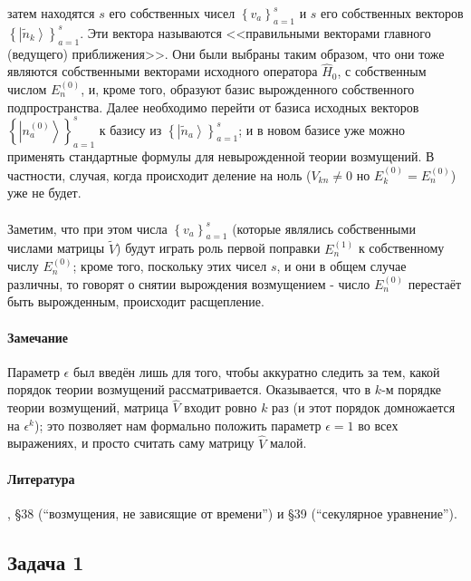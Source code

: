 \documentclass[a4paper,12pt]{article}
\begin{document}
\noindent
затем находятся $s$ его собственных чисел $\left\{ v_{a}\right\} _{a=1}^{s}$
и $s$ его собственных векторов $\left\{ \left|\widetilde{n}_{k}\right\rangle \right\} _{a=1}^{s}$.
Эти вектора называются <<правильными векторами главного (ведущего)
приближения>>. Они были выбраны таким образом, что они тоже являются
собственными векторами исходного оператора $\hat{H}_{0}$, с собственным
числом $E_{n}^{(0)}$, и, кроме того, образуют базис вырожденного
собственного подпространства. Далее необходимо перейти от базиса исходных
векторов $\left\{ \left|n_{a}^{(0)}\right\rangle \right\} _{a=1}^{s}$
к базису из $\left\{ \left|\widetilde{n}_{a}\right\rangle \right\} _{a=1}^{s}$;
и в новом базисе уже можно применять стандартные формулы для невырожденной
теории возмущений. В частности, случая, когда происходит деление на
ноль ($V_{kn}\neq0$ но $E_{k}^{(0)}=E_{n}^{(0)}$) уже не будет.\\\\
Заметим, что при этом числа $\left\{ v_{a}\right\} _{a=1}^{s}$ (которые
являлись собственными числами матрицы $\widetilde{V}$) будут играть
роль первой поправки $E_{n}^{(1)}$ к собственному числу $E_{n}^{(0)}$;
кроме того, поскольку этих чисел $s$, и они в общем случае различны,
то говорят о снятии вырождения возмущением - число $E_{n}^{(0)}$
перестаёт быть вырожденным, происходит расщепление.



\paragraph{Замечание}

Параметр $\epsilon$ был введён лишь для того, чтобы аккуратно следить
за тем, какой порядок теории возмущений рассматривается. Оказывается,
что в $k$-м порядке теории возмущений, матрица $\hat{V}$ входит
ровно $k$ раз (и этот порядок домножается на $\epsilon^{k}$); это
позволяет нам формально положить параметр $\epsilon=1$ во всех выражениях,
и просто считать саму матрицу $\hat{V}$ малой.

\paragraph{Литература}
\cite{LL3}, §38 (``возмущения, не зависящие от времени'') и §39 (``секулярное уравнение'').

\subsection*{Задача 1}
\end{document}

